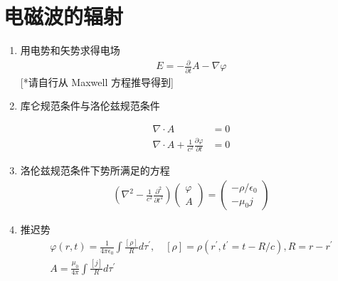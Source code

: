 \documentclass[../../note.tex]{subfiles}
\begin{document}
\section{电磁波的辐射}
\begin{enumerate}
	\item 用电势和矢势求得电场
	\begin{align}
	{E}=-\frac{\partial}{\partial t} {A}-\nabla \varphi
\end{align}
	[*请自行从 Maxwell 方程推导得到]
	\item 库仑规范条件与洛伦兹规范条件
	
	\begin{align}
		\nabla \cdot {A} & =0 \\
		\nabla \cdot {A}+\frac{1}{c^2} \frac{\partial \varphi}{\partial t} & =0
	\end{align}
	\item 洛伦兹规范条件下势所满足的方程
	\begin{align}
	\left(\nabla^2-\frac{1}{c^2} \frac{\partial^2}{\partial t^2}\right)\left(\begin{array}{l}
		\varphi \\
		{A}
	\end{array}\right)=\left(\begin{array}{c}
		-\rho / \epsilon_0 \\
		-\mu_0 {j}
	\end{array}\right)
	\end{align}
	\item 推迟势
	\begin{align}
		\varphi(r, t)=\frac{1}{4 \pi \epsilon_0} \int \frac{[\rho]}{R} d \tau^{\prime}, \quad[\rho]=\rho\left(r^{\prime}, t^{\prime}=t-R / c\right), R=r-r^{\prime} \\
		A=\frac{\mu_0}{4 \pi} \int \frac{[j]}{R} d \tau^{\prime}
	\end{align}
	

\end{enumerate}
\end{document}
